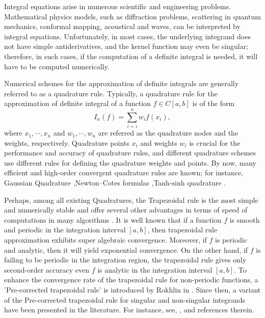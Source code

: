 \documentclass[../document.tex]{subfiles}
\begin{document}
	
	
	
	Integral equations arise in numerous scientific and engineering problems.  Mathematical physics models, such as diffraction problems, scattering in quantum mechanics, conformal mapping, acoustical and waves, can be interpreted by integral equations. Unfortunately, in most cases, the underlying integrand does not have simple antiderivatives, and the  kernel function may even be singular; therefore, in such cases, if the computation of a definite integral is needed, it will have to be 
	computed numerically.
	
	\vspace{3mm}
	
	Numerical schemes for the approximation of definite integrals are generally referred to as a quadrature rule.  Typically, a quadrature rule for the approximation of definite integral of a function $f\in C[a,b]$ is of the form
	$$
	I_{n}(f)=\sum_{i=i}^{n} w_{i} f\left(x_{i}\right),
	$$
	where $x_1,\cdots,x_n$ and $w_1,\cdots,w_n$ are referred as the quadrature nodes and
	the weights, respectively. Quadrature points $x_i$ and weights $w_i$ is crucial for the performance and accuracy of quadrature rules, and different quadrature schemes use different rules for defining the quadrature weights and points.  
	By now, many efficient and high-order convergent quadrature rules are known; for instance, Gaussian Quadrature \cite{atkinson2008introduction} ,Newton–Cotes formulas
	\cite{epperson2013introduction} ,Tanh-sinh quadrature \cite{epperson2013introduction}.
	
	\vspace{3mm}
	
	Perhaps, among all existing Quadratures, the Trapezoidal rule is the most simple and numerically stable and offer several other advantages in terms of speed of computations in many algorithms \cite{marin2014corrected}.
	It is well known that if a function $f$ is smooth and periodic in the integration interval $[a,b]$, then trapezoidal rule approximation exhibits super algebraic convergence. Moreover, if $f$ is periodic and analytic, then it will yield exponential convergence.  On the other hand, if $f$ is failing to be periodic in the integration region, the trapezoidal rule gives only second-order accuracy \cite{kapur1997high} even $f$ is analytic in the integration interval $[a,b]$. To enhance the convergence rate of the trapezoidal rule for non-periodic functions, a 'Pre-corrected trapezoidal rule' is introduced by Rokhlin in \cite{rokhlin1990end}.  Since then, a variant of the Pre-corrected trapezoidal rule for singular and non-singular integrands have been presented in the literature. For instance, see, \cite{kapur1997high,marin2012quadrature,marin2014corrected, trefethen2014exponentially}, and references therein.    
	
\end{document}
